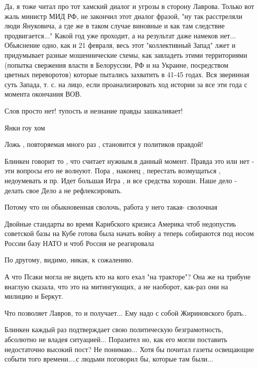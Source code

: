\begin{itemize}

Да, я тоже читал про тот хамский диалог и угрозы в сторону Лаврова. Только вот
жаль министр МИД РФ, не закончил этот диалог фразой, "ну так расстреляли люди
Януковича, а где же в таком случае виновные и как там следствие
продвигается..." Какой год уже проходит, а на результат даже намеков нет...
Обьяснение одно, как и 21 февраля, весь этот "коллективный Запад" лжет и
придумывает разные мошеннические схемы, как завладеть этими территориями
(попытка свержения власти в Белоруссии, РФ и на Украине, посредством цветных
переворотов) которые пытались захватить в 41-45 годах. Вся зверинная суть
Запада, т. с. на лицо, если проанализировать ход истории за все эти года с
момента окончания ВОВ.


Слов просто нет! тупость и незнание правды зашкаливает!

Янки гоу хом

Ложь , повторяемая много раз , становится у политиков правдой!


Блинкен говорит то , что считает нужным.в данный момент. Правда это или нет -
эти вопросы его не волнуют. Пора , наконец , перестать возмущаться ,
недоумевать и пр. Идет большая Игра , и все средства хороши. Наше дело - делать
свое Дело а не рефлексировать.


Потому что он обыкновенная сволочь, работа у него такая- сволочная


Двойные стандарты во время Карибского кризиса Америка чтоб недопустиь советской
базы на Кубе готова была начать войну а теперь собираются под носом России базу
НАТО и чтоб Россия не реагировала


По другому, видимо, никак, к сожалению.


А что Псаки могла не видеть кто на кого ехал "на тракторе"? Она же на трибуне
внаглую сказала, что это на митингующих, а не наоборот, как-раз они на милицию
и Беркут.


Что позволяет Лавров, то и получает... Ему надо с собой Жириновского брать..


Блинкен каждый раз подтверждает свою политическую безграмотность, абсолютно не
владея ситуацией... Поразител но, как его могли поставить недостаточно высокий
пост? Не понимаю... Хотя бы почитал газеты освещающие событи того времени....с
людьми поговорил бы, которые там были...



\end{itemize}
